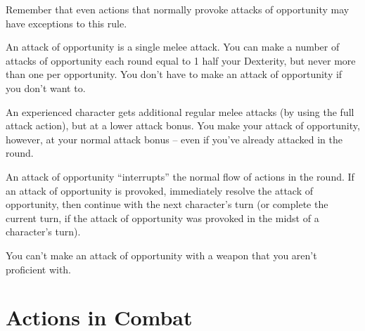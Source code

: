 \par Remember that even actions that normally provoke attacks of opportunity may have exceptions to this rule.

 An attack of opportunity is a single melee attack. You can make a number of attacks of opportunity each round equal to 1 \add half your Dexterity, but never more than one per opportunity. You don't have to make an attack of opportunity if you don't want to.

An experienced character gets additional regular melee attacks (by using the full attack action), but at a lower attack bonus. You make your attack of opportunity, however, at your normal attack bonus -- even if you've already attacked in the round.

An attack of opportunity ``interrupts'' the normal flow of actions in the round. If an attack of opportunity is provoked, immediately resolve the attack of opportunity, then continue with the next character's turn (or complete the current turn, if the attack of opportunity was provoked in the midst of a character's turn).

 You can't make an attack of opportunity with a weapon that you aren't proficient with.

\section{Actions in Combat}

